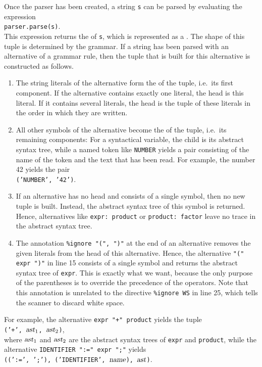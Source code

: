 \noindent
Once the parser has been created, a string \texttt{s} can be parsed by evaluating the expression
\\[0.2cm]
\hspace*{1.3cm}
\texttt{parser.parse(s)}.
\\[0.2cm]
This expression returns the  of \texttt{s}, which is represented as a
.  The shape of this tuple is determined by the grammar.  If a string has been parsed with
an alternative of a grammar rule, then the tuple that is built for this alternative is constructed as follows.
\begin{enumerate}
\item The string literals of the alternative form the 
      of the tuple, i.e.~its first component.  If the alternative contains exactly one literal, the head is
      this literal.  If it contains several literals, the head is the tuple of these literals in the order in
      which they are written.
\item All other symbols of the alternative become the  of the tuple, i.e.~its remaining
      components:  For a syntactical variable, the child is its abstract syntax tree, while a named token like
      \texttt{NUMBER} yields a pair consisting of the name of the token and the text that has been read.
      For example, the number 42 yields the pair
      \\[0.2cm]
      \hspace*{1.3cm}
      \texttt{('NUMBER', '42')}.
\item If an alternative has no head and consists of a single symbol, then no new tuple is built.  Instead,
      the abstract syntax tree of this symbol is returned.  Hence, alternatives like \texttt{expr: product} or
      \texttt{product: factor} leave no trace in the abstract syntax tree.
\item The annotation \texttt{\%ignore "(", ")"} at the end of an alternative removes the given literals from
      the head of this alternative.  Hence, the alternative \texttt{"(" expr ")"} in line 15 consists of a
      single symbol and returns the abstract syntax tree of \texttt{expr}.  This is exactly what we want,
      because the only purpose of the parentheses is to override the precedence of the operators.  Note
      that this annotation is unrelated to the directive \texttt{\%ignore WS} in line 25, which tells the
      scanner to discard white space.
\end{enumerate}
For example, the alternative \texttt{expr "+" product} yields the tuple
\\[0.2cm]
\hspace*{1.3cm}
\texttt{('+', $\textsl{ast}_1$, $\textsl{ast}_2$)},
\\[0.2cm]
where $\textsl{ast}_1$ and $\textsl{ast}_2$ are the abstract syntax trees of \texttt{expr} and \texttt{product},
while the alternative \texttt{IDENTIFIER ":=" expr ";"} yields
\\[0.2cm]
\hspace*{1.3cm}
\texttt{((':=', ';'), ('IDENTIFIER', $\textsl{name}$), $\textsl{ast}$)}.

